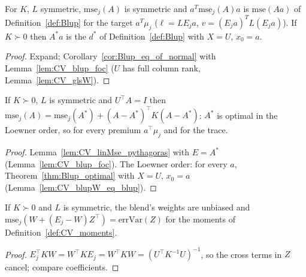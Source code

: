 \begin{lemma}\label{lem:CV_blupW_eq_blup}
  \leanok
  For $K$, $L$ symmetric, $\mathrm{mse}_j(A)$ is symmetric and
  $a^T\mathrm{mse}_j(A)a$ is $\mathrm{mse}(Aa)$ of Definition~\ref{def:Blup} for the
  target $a^T\mu_j$ ($\ell = LE_ja$, $v = (E_ja)^TL(E_ja)$). If $K \succ 0$ then
  $A^\ast a$ is the $d^*$ of Definition~\ref{def:Blup} with $X = U$, $x_0 = a$.
\end{lemma}
\begin{proof}
  \leanok
  Expand; Corollary~\ref{cor:Blup_eq_of_normal} with Lemma~\ref{lem:CV_blup_foc}
  ($U$ has full column rank, Lemma~\ref{lem:CV_glsW}).
\end{proof}

\begin{theorem}\label{thm:CV_blup_optimal}
  \leanok
  If $K \succ 0$, $L$ is symmetric and $U^\top A = I$ then
  $\mathrm{mse}_j(A) = \mathrm{mse}_j(A^\ast) + (A - A^\ast)^\top K(A - A^\ast)$: $A^\ast$ is
  optimal in the Loewner order, so for every premium $a^\top\mu_j$ and for the trace.
\end{theorem}
\begin{proof}
  \leanok
  Lemma~\ref{lem:CV_linMse_pythagoras} with $E = A^\ast$ (Lemma~\ref{lem:CV_blup_foc}).
  The Loewner order: for every $a$, Theorem~\ref{thm:Blup_optimal} with $X = U$,
  $x_0 = a$ (Lemma~\ref{lem:CV_blupW_eq_blup}).
\end{proof}

\begin{lemma}\label{lem:CV_blendW}
  \leanok
  If $K \succ 0$ and $L$ is symmetric, the blend's weights are unbiased and
  $\mathrm{mse}_j(W + (E_j - W)Z^\top) = \mathrm{errVar}(Z)$ for the moments of
  Definition~\ref{def:CV_moments}.
\end{lemma}
\begin{proof}
  \leanok
  $E_j^\top KW = W^\top KE_j = W^\top KW = (U^\top K^{-1}U)^{-1}$, so the cross terms in $Z$
  cancel; compare coefficients.
\end{proof}

